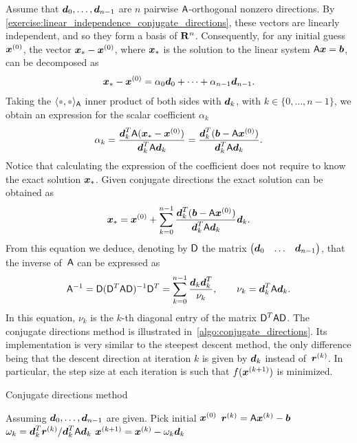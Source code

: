 Assume that $\mathbf{\boldsymbol{d}}_0, \dotsc, \mathbf{\boldsymbol{d}}_{n-1}$ are $n$ pairwise $\mathsf A$-orthogonal nonzero directions.
By \cref{exercise:linear_independence_conjugate_directions},
these vectors are linearly independent,
and so they form a basis of $\mathbf R^n$.
Consequently, for any initial guess $\mathbf{\boldsymbol{x}}^{(0)}$,
the vector $\mathbf{\boldsymbol{x}}_* - \mathbf{\boldsymbol{x}}^{(0)}$,
where $\mathbf{\boldsymbol{x}}_*$ is the solution to the linear system $\mathsf A \mathbf{\boldsymbol{x}} = \mathbf{\boldsymbol{b}}$,
can be decomposed as
\[
    \mathbf{\boldsymbol{x}}_* - \mathbf{\boldsymbol{x}}^{(0)} = \alpha_0 \mathbf{\boldsymbol{d}}_0 + \dotsb + \alpha_{n-1} \mathbf{\boldsymbol{d}}_{n-1}.
\]
Taking the $\ip{\placeholder, \placeholder}_{\mat A}$ inner product of both sides with $\mathbf{\boldsymbol{d}}_k$,
with $k \in \{0, \dotsc, n-1\}$,
we obtain an expression for the scalar coefficient $\alpha_k$
\[
    \alpha_k = \frac{\mathbf{\boldsymbol{d}}_k^T \mathsf A (\mathbf{\boldsymbol{x}}_* - \mathbf{\boldsymbol{x}}^{(0)})}{\mathbf{\boldsymbol{d}}_k^T \mathsf A \mathbf{\boldsymbol{d}}_k}
    = \frac{\mathbf{\boldsymbol{d}}_k^T (\mathbf{\boldsymbol{b}} - \mathsf A \mathbf{\boldsymbol{x}}^{(0)})}{\mathbf{\boldsymbol{d}}_k^T \mathsf A \mathbf{\boldsymbol{d}}_k}.
\]
Notice that calculating the expression of the coefficient does not require to know the exact solution $\mathbf{\boldsymbol{x}}_*$.
Given conjugate directions the exact solution can be obtained as
\begin{equation}
    \label{eq:linear_expansion_conjugate_direction}
    \mathbf{\boldsymbol{x}}_* = \mathbf{\boldsymbol{x}}^{(0)} + \sum_{k=0}^{n-1} \frac{\mathbf{\boldsymbol{d}}_k^T (\mathbf{\boldsymbol{b}} - \mathsf A \mathbf{\boldsymbol{x}}^{(0)})}{\mathbf{\boldsymbol{d}}_k^T \mathsf A \mathbf{\boldsymbol{d}}_k} \mathbf{\boldsymbol{d}}_k.
\end{equation}
From this equation we deduce,
denoting by $\mathsf D$ the matrix $\begin{pmatrix} \mathbf{\boldsymbol{d}}_0 & \hdots & \mathbf{\boldsymbol{d}}_{n-1} \end{pmatrix}$,
that the inverse of~$\mathsf A$ can be expressed as
\[
    \mathsf A^{-1} = \mathsf D (\mathsf D^T \mathsf A \mathsf D)^{-1} \mathsf D^T
    = \sum_{k=0}^{n-1} \frac{\mathbf{\boldsymbol{d}}_k \mathbf{\boldsymbol{d}}_k^T}{\nu_k}, \qquad \nu_k = \mathbf{\boldsymbol{d}}_k^T \mathsf A \mathbf{\boldsymbol{d}}_k.
\]
In this equation, $\nu_k$ is the $k$-th diagonal entry of the matrix $\mathsf D^T \mathsf A \mathsf D$.
The conjugate directions method is illustrated in~\cref{algo:conjugate_directions}.
Its implementation is very similar to the steepest descent method,
the only difference being that the descent direction at iteration $k$ is given by $\mathbf{\boldsymbol{d}}_k$ instead of~$\mathbf{\boldsymbol{r}}^{(k)}$.
In particular, the step size at each iteration is such that $f(\mathbf{\boldsymbol{x}}^{(k+1)})$ is minimized.
\begin{algorithm}
    \caption{Conjugate directions method}%
    \label{algo:conjugate_directions}%
    \begin{algorithmic}[1]
        \State Assuming $\mathbf{\boldsymbol{d}}_0, \dotsc, \mathbf{\boldsymbol{d}}_{n-1}$ are given.
        \State Pick initial $\mathbf{\boldsymbol{x}}^{(0)}$
            \State $\mathbf{\boldsymbol{r}}^{(k)} = \mathsf A \mathbf{\boldsymbol{x}}^{(k)} - \mathbf{\boldsymbol{b}}$
            \State $\omega_k = \mathbf{\boldsymbol{d}}_k^T \mathbf{\boldsymbol{r}}^{(k)}/\mathbf{\boldsymbol{d}}_k^T \mathsf A \mathbf{\boldsymbol{d}}_k$
            \State $\mathbf{\boldsymbol{x}}^{(k+1)} = \mathbf{\boldsymbol{x}}^{(k)} - \omega_k \mathbf{\boldsymbol{d}}_k$
        \EndFor
    \end{algorithmic}
\end{algorithm}

